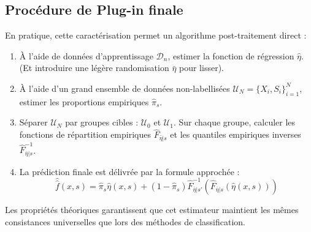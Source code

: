 \subsection{Procédure de Plug-in finale}
En pratique, cette caractérisation permet un algorithme post-traitement direct :
\begin{enumerate}
    \item À l'aide de données d'apprentissage $\mathcal{D}_n$, estimer la fonction de régression $\hat{\eta}$. (Et introduire une légère randomisation $\bar{\eta}$ pour lisser).
    \item À l'aide d'un grand ensemble de données non-labellisées $\mathcal{U}_N = \{X_i, S_i\}_{i=1}^N$, estimer  les proportions empiriques $\hat{\pi}_s$.
    \item Séparer $\mathcal{U}_N$ par groupes cibles : $\mathcal{U}_0$ et $\mathcal{U}_1$. Sur chaque groupe, calculer les fonctions de répartition empiriques $\hat{F}_{\bar{\eta}|s}$ et les quantiles empiriques inverses $\hat{F}_{\bar{\eta}|s}^{-1}$.
    \item La prédiction finale est délivrée par la formule approchée :
    \begin{equation}
        \hat{\hat{f}}(x, s) = \hat{\pi}_s \hat{\eta}(x, s) + (1 - \hat{\pi}_s) \hat{F}_{\bar{\eta}|s'}^{-1} \left( \hat{F}_{\bar{\eta}|s}(\hat{\eta}(x, s)) \right)
    \end{equation}
\end{enumerate}
Les propriétés théoriques garantissent que cet estimateur maintient les mêmes consistances universelles que lors des méthodes de classification.
